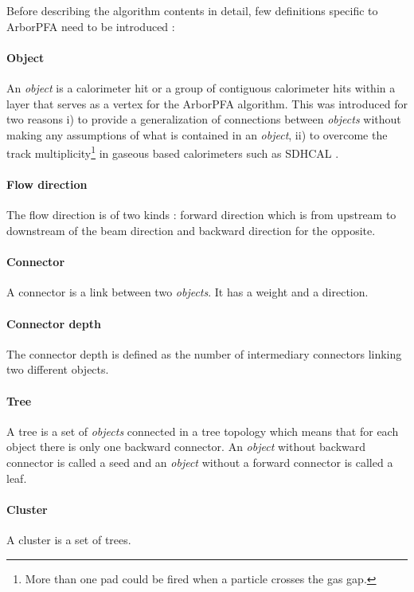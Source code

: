 \documentclass[cits]{JINST}
\begin{document}
Before describing the algorithm contents in detail, few definitions specific to ArborPFA need to be introduced :

\paragraph*{Object} An \textit{object} is a calorimeter hit or a group of contiguous calorimeter hits within a layer that serves as a vertex for the ArborPFA algorithm. This was introduced for two reasons i) to provide a generalization of connections between \textit{objects} without making any assumptions of what is contained in an \textit{object}, ii) to overcome the track multiplicity\footnote{More than one pad could be fired when a particle crosses the gas gap.} in gaseous based calorimeters such as SDHCAL \cite{sdhcal-paper}.

\paragraph*{Flow direction} The flow direction is of two kinds : forward direction which is from upstream to downstream of the beam direction and backward direction for the opposite.

\paragraph*{Connector} A connector is a link between two \textit{objects}. It has a weight and a direction.

\paragraph*{Connector depth} The connector depth is defined as the number of intermediary connectors linking two different objects.

\paragraph*{Tree} A tree is a set of \textit{objects} connected in a tree topology which means that for each object there is only one backward connector. An \textit{object} without backward connector is called a seed and an \textit{object} without a forward connector is called a leaf.

\paragraph*{Cluster} A cluster is a set of trees.
\end{document}
